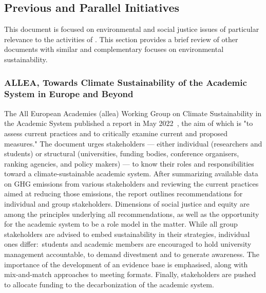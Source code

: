 \documentclass[../SustainableHEP.tex]{subfiles}
\begin{document}

\newpage

\subsection{Previous and Parallel Initiatives}
\label{sec:other_initiatives}

This document is focused on environmental and social justice issues of particular relevance to the activities of \ACR.  This section provides a brief review of other documents with similar and complementary focuses on environmental sustainability.


\subsubsection{ALLEA, Towards Climate Sustainability of the Academic System in Europe and Beyond}

The All European Academies (\acrshort{allea}) Working Group on Climate Sustainability in the Academic System published a report in May 2022~\cite{ALLEA}, the aim of which is "to  assess current practices and to critically examine current and proposed measures." 
The document urges stakeholders --- either individual (researchers and students) or structural (universities, funding bodies, conference organisers, ranking agencies, and
policy makers) --- to know their roles and responsibilities toward a climate-sustainable academic system.
After summarizing available data on GHG emissions from various stakeholders and reviewing
the current practices aimed at reducing those
emissions, the report outlines recommendations for individual and group stakeholders. 
Dimensions of social justice and equity are among the principles underlying all recommendations, as well as the opportunity for the academic system to be a role model in the matter. 
While all group stakeholders are advised to embed sustainability in their strategies, individual ones differ:\ students and academic members are encouraged to hold university management accountable, to demand divestment and to generate awareness. 
The importance of the development of an evidence base is emphasised, along with mix-and-match approaches to meeting formats. 
Finally, stakeholders are pushed to allocate funding to the decarbonization of the academic system.

\end{document}
